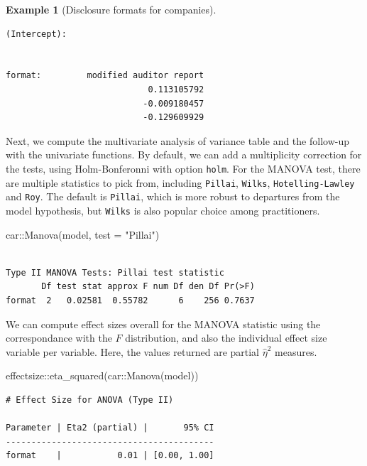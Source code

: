 \documentclass[
  11pt,
  letterpaper,
]{scrbook}
\newenvironment{Shaded}{\begin{snugshade}}{\end{snugshade}}
\newcommand{\AttributeTok}[1]{\textcolor[rgb]{0.40,0.45,0.13}{#1}}
\newcommand{\FunctionTok}[1]{\textcolor[rgb]{0.28,0.35,0.67}{#1}}
\newcommand{\NormalTok}[1]{\textcolor[rgb]{0.00,0.23,0.31}{#1}}
\newcommand{\SpecialCharTok}[1]{\textcolor[rgb]{0.37,0.37,0.37}{#1}}
\newcommand{\StringTok}[1]{\textcolor[rgb]{0.13,0.47,0.30}{#1}}
\theoremstyle{definition}
\newtheorem{example}{Example}[chapter]
\theoremstyle{definition}
\theoremstyle{remark}
\begin{document}
\begin{example}[Disclosure formats for
companies]
\begin{verbatim}
(Intercept):                           
                                       
                                       
format:         modified auditor report
                            0.113105792
                           -0.009180457
                           -0.129609929
\end{verbatim}

Next, we compute the multivariate analysis of variance table and the
follow-up with the univariate functions. By default, we can add a
multiplicity correction for the tests, using Holm-Bonferonni with option
\texttt{\textquotesingle{}holm\textquotesingle{}}. For the MANOVA test,
there are multiple statistics to pick from, including \texttt{Pillai},
\texttt{Wilks}, \texttt{Hotelling-Lawley} and \texttt{Roy}. The default
is \texttt{Pillai}, which is more robust to departures from the model
hypothesis, but \texttt{Wilks} is also popular choice among
practitioners.

\begin{Shaded}
\begin{Highlighting}[]
\NormalTok{car}\SpecialCharTok{::}\FunctionTok{Manova}\NormalTok{(model, }\AttributeTok{test =} \StringTok{"Pillai"}\NormalTok{)}
\end{Highlighting}
\end{Shaded}

\begin{verbatim}

Type II MANOVA Tests: Pillai test statistic
       Df test stat approx F num Df den Df Pr(>F)
format  2   0.02581  0.55782      6    256 0.7637
\end{verbatim}

We can compute effect sizes overall for the MANOVA statistic using the
correspondance with the \(F\) distribution, and also the individual
effect size variable per variable. Here, the values returned are partial
\(\widehat{\eta}^2\) measures.

\begin{Shaded}
\begin{Highlighting}[]
\NormalTok{effectsize}\SpecialCharTok{::}\FunctionTok{eta\_squared}\NormalTok{(car}\SpecialCharTok{::}\FunctionTok{Manova}\NormalTok{(model))}
\end{Highlighting}
\end{Shaded}

\begin{verbatim}
# Effect Size for ANOVA (Type II)

Parameter | Eta2 (partial) |       95% CI
-----------------------------------------
format    |           0.01 | [0.00, 1.00]


\end{verbatim}
\end{example}
\end{document}
